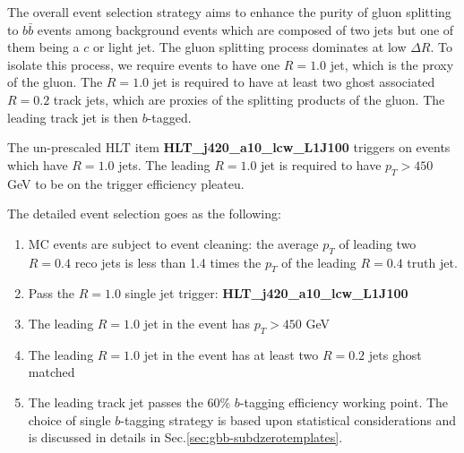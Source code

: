 \label{sec:gbb-eventselection}

The overall event selection strategy aims to enhance the purity of gluon splitting to $b \bar b$ events among background events which are composed of two jets but one of them being a $c$ or light jet. The gluon splitting process dominates at low $\Delta R$. To isolate this process, we require events to have one $R=1.0$ jet, which is the proxy of the gluon. The $R=1.0$ jet is required to have at least two ghost associated $R=0.2$ track jets, which are proxies of the splitting products of the gluon. The leading track jet is then $b$-tagged. 

The un-prescaled HLT item \textbf{HLT\_j420\_a10\_lcw\_L1J100} triggers on events which have $R=1.0$ jets. The leading $R=1.0$ jet is required to have $p_T>450$ GeV to be on the trigger efficiency pleateu. 

The detailed event selection goes as the following:
\begin{enumerate}
	\item MC events are subject to event cleaning: the average $p_T$ of leading two $R=0.4$ reco jets is less than 1.4 times the $p_T$ of the leading $R=0.4$ truth jet. 
	\item Pass the $R=1.0$ single jet trigger: \textbf{HLT\_j420\_a10\_lcw\_L1J100}
	\item The leading $R=1.0$ jet in the event has $p_T>450$ GeV
        \item The leading $R=1.0$ jet in the event has at least two $R=0.2$ jets ghost matched
	\item The leading track jet passes the 60\% $b$-tagging efficiency working point. The choice of single $b$-tagging strategy is based upon statistical considerations and is discussed in details in Sec.\ref{sec:gbb-subdzerotemplates}.
\end{enumerate}
